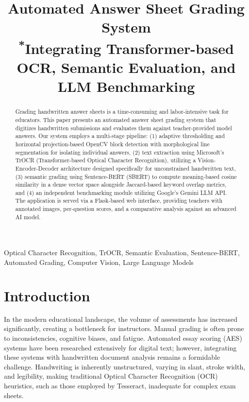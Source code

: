 \documentclass[conference]{IEEEtran}
\begin{document}
\title{Automated Answer Sheet Grading System\\
{\footnotesize \textsuperscript{*}Integrating Transformer-based OCR, Semantic Evaluation, and LLM Benchmarking}
}

\author{
}

\maketitle

\begin{abstract}
Grading handwritten answer sheets is a time-consuming and labor-intensive task for educators. This paper presents an automated answer sheet grading system that digitizes handwritten submissions and evaluates them against teacher-provided model answers. Our system employs a multi-stage pipeline: (1) adaptive thresholding and horizontal projection-based OpenCV block detection with morphological line segmentation for isolating individual answers, (2) text extraction using Microsoft's TrOCR (Transformer-based Optical Character Recognition), utilizing a Vision-Encoder-Decoder architecture designed specifically for unconstrained handwritten text, (3) semantic grading using Sentence-BERT (SBERT) to compute meaning-based cosine similarity in a dense vector space alongside Jaccard-based keyword overlap metrics, and (4) an independent benchmarking module utilizing Google's Gemini LLM API. The application is served via a Flask-based web interface, providing teachers with annotated images, per-question scores, and a comparative analysis against an advanced AI model.
\end{abstract}

\begin{IEEEkeywords}
Optical Character Recognition, TrOCR, Semantic Evaluation, Sentence-BERT, Automated Grading, Computer Vision, Large Language Models
\end{IEEEkeywords}

\section{Introduction}
In the modern educational landscape, the volume of assessments has increased significantly, creating a bottleneck for instructors. Manual grading is often prone to inconsistencies, cognitive biases, and fatigue. Automated essay scoring (AES) systems have been researched extensively for digital text; however, integrating these systems with handwritten document analysis remains a formidable challenge. Handwriting is inherently unstructured, varying in slant, stroke width, and legibility, making traditional Optical Character Recognition (OCR) heuristics, such as those employed by Tesseract, inadequate for complex exam sheets. 
\end{document}
